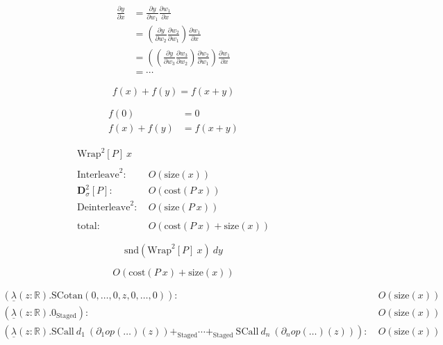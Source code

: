 \documentclass[a4paper,12pt]{article}
\newcommand*{\prv}[1]{\partial #1}
\newcommand*{\prw}[1]{\partial w_{#1}}
\begin{document}
    \begin{align*}
        \frac{\prv{y}}{\prv{x}}&=\frac{\prv{y}}{\prw{1}}\frac{\prw{1}}{\prv{x}}\\
        &=\left(\frac{\prv{y}}{\prw{2}}\frac{\prw{2}}{\prw{1}}\right)\frac{\prw{1}}{\prv{x}}\\
        &=\left(\left(\frac{\prv{y}}{\prw{3}}\frac{\prw{3}}{\prw{2}}\right)\frac{\prw{2}}{\prw{1}}\right)\frac{\prw{1}}{\prv{x}}\\
        &=\cdots
    \end{align*}

    \begin{equation*}
        f(x)+f(y)=f(x+y)
    \end{equation*}

    \begin{align*}
        f(0)&=0\\
        f(x)+f(y)&=f(x+y)
    \end{align*}

    \begin{align*}
        \text{Wrap}^2[P]\ x\\
        \\
        \text{Interleave}^2:\ &O(\text{size}(x))\\
        \textbf{D}^2_\sigma[P]:\ &O(\text{cost}(P\ x))\\
        \text{Deinterleave}^2:\ &O(\text{size}(P\ x))\\
        \\
        \text{total}:\ &O(\text{cost}(P\ x)+\text{size}(x))
    \end{align*}

    \begin{equation*}
        \text{snd}(\text{Wrap}^2[P]\ x)\ dy
    \end{equation*}

    \begin{equation*}
        O(\text{cost}(P\ x)+\text{size}(x))
    \end{equation*}

    \begin{align*}
        (\underline{\lambda}(z:\mathbb{R}).\text{SCotan}(0,\dots,0,z,0,\dots,0)):\ &O(\text{size}(x))\\
        (\underline{\lambda}(z:\mathbb{R}).0_\text{Staged}):\ &O(\text{size}(x))\\
        (\underline{\lambda}(z:\mathbb{R}).\text{SCall}\ d_1\ (\partial_1\textit{op}(\dots)(z))+_\text{Staged}\cdots+_\text{Staged}\ \text{SCall}\ d_n\ (\partial_n\textit{op}(\dots)(z))):\ &O(\text{size}(x))
    \end{align*}
\end{document}
